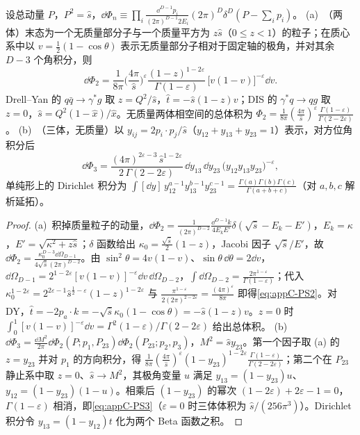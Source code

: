 \begin{lemma}[$D$ 维相空间]\label{lem:appC-phase-space}
设总动量 $P$，$P^2=\hat s$，$\dd\Phi_n\equiv\prod_i\frac{\dd^{D-1}p_i}{(2\pi)^{D-1}2E_i}(2\pi)^D\delta^D(P-\sum_ip_i)$。
(a)~（两体）末态为一个无质量部分子与一个质量平方为 $z\hat s$（$0\le z<1$）的粒子；在质心系中以 $v=\frac12(1-\cos\theta)$ 表示无质量部分子相对于固定轴的极角，并对其余 $D-3$ 个角积分，则
\begin{equation}\label{eq:appC-PS2}
\dd\Phi_2=\frac1{8\pi}\Big(\frac{4\pi}{\hat s}\Big)^{\varepsilon}\frac{(1-z)^{1-2\varepsilon}}{\Gamma(1-\varepsilon)}\,\big[v(1-v)\big]^{-\varepsilon}\dd v .
\end{equation}
Drell--Yan 的 $q\bar q\to\gamma^*g$ 取 $z=Q^2/\hat s$，$\hat t=-\hat s(1-z)v$；DIS 的 $\gamma^*q\to qg$ 取 $z=0$，$\hat s=Q^2(1-\hat x)/\hat x$。无质量两体相空间的总体积为 $\Phi_2=\frac1{8\pi}(\frac{4\pi}{\hat s})^\varepsilon\frac{\Gamma(1-\varepsilon)}{\Gamma(2-2\varepsilon)}$。
(b)~（三体，无质量）以 $y_{ij}=2p_i\cdot p_j/\hat s$（$y_{12}+y_{13}+y_{23}=1$）表示，对方位角积分后
\begin{equation}\label{eq:appC-PS3}
\dd\Phi_3=\frac{(4\pi)^{2\varepsilon-3}\,\hat s^{1-2\varepsilon}}{2\,\Gamma(2-2\varepsilon)}\,\dd y_{13}\,\dd y_{23}\,\big(y_{12}y_{13}y_{23}\big)^{-\varepsilon},
\end{equation}
单纯形上的 Dirichlet 积分为 $\int[\dd y]\,y_{12}^{a-1}y_{13}^{b-1}y_{23}^{c-1}=\frac{\Gamma(a)\Gamma(b)\Gamma(c)}{\Gamma(a+b+c)}$（对 $a,b,c$ 解析延拓）。
\end{lemma}
\begin{proof}
(a)~积掉质量粒子的动量，$\dd\Phi_2=\frac{1}{(2\pi)^{D-2}}\frac{\dd^{D-1}k}{4E_kE'}\delta(\sqrt{\hat s}-E_k-E')$，$E_k=\kappa$，$E'=\sqrt{\kappa^2+z\hat s}$；$\delta$ 函数给出 $\kappa_0=\frac{\sqrt{\hat s}}2(1-z)$，Jacobi 因子 $\sqrt{\hat s}/E'$，故 $\dd\Phi_2=\frac{\kappa_0^{D-3}\dd\Omega_{D-1}}{4\sqrt{\hat s}(2\pi)^{D-2}}$。由 $\sin^2\theta=4v(1-v)$、$\sin\theta\,\dd\theta=2\dd v$，$\dd\Omega_{D-1}=2^{1-2\varepsilon}[v(1-v)]^{-\varepsilon}\dd v\,\dd\Omega_{D-2}$，$\int\dd\Omega_{D-2}=\frac{2\pi^{1-\varepsilon}}{\Gamma(1-\varepsilon)}$；代入 $\kappa_0^{1-2\varepsilon}=2^{2\varepsilon-1}\hat s^{\frac12-\varepsilon}(1-z)^{1-2\varepsilon}$ 与 $\frac{\pi^{1-\varepsilon}}{2(2\pi)^{2-2\varepsilon}}=\frac{(4\pi)^\varepsilon}{8\pi}$ 即得\cref{eq:appC-PS2}。对 DY，$\hat t=-2p_a\cdot k=-\sqrt{\hat s}\kappa_0(1-\cos\theta)=-\hat s(1-z)v$。$z=0$ 时 $\int_0^1[v(1-v)]^{-\varepsilon}\dd v=\Gamma^2(1-\varepsilon)/\Gamma(2-2\varepsilon)$ 给出总体积。
(b)~$\dd\Phi_3=\frac{\dd M^2}{2\pi}\dd\Phi_2(P;p_1,P_{23})\dd\Phi_2(P_{23};p_2,p_3)$，$M^2=\hat sy_{23}$。第一个因子取 (a) 的 $z=y_{23}$ 并对 $p_1$ 的方向积分，得 $\frac1{8\pi}(\frac{4\pi}{\hat s})^\varepsilon(1-y_{23})^{1-2\varepsilon}\frac{\Gamma(1-\varepsilon)}{\Gamma(2-2\varepsilon)}$；第二个在 $P_{23}$ 静止系中取 $z=0$、$\hat s\to M^2$，其极角变量 $u$ 满足 $y_{13}=(1-y_{23})u$、$y_{12}=(1-y_{23})(1-u)$。相乘后 $(1-y_{23})$ 的幂次 $(1-2\varepsilon)+2\varepsilon-1=0$，$\Gamma(1-\varepsilon)$ 相消，即\cref{eq:appC-PS3}（$\varepsilon=0$ 时三体体积为 $\hat s/(256\pi^3)$）。Dirichlet 积分令 $y_{13}=(1-y_{12})t$ 化为两个 Beta 函数之积。
\end{proof}

